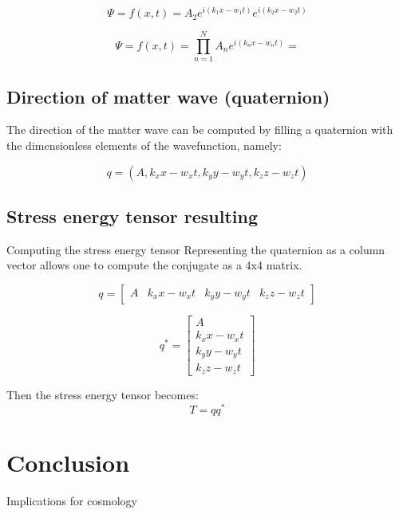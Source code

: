\documentclass{article}
\begin{document}
$$\Psi=f(x,t)=A_2 e^{i(k_1 x-w_1 t)}e^{i(k_2 x-w_2 t)}$$

$$\Psi=f(x,t)=\prod_{n=1}^N{A_n e^{i(k_n x-w_n t)}}=$$

\subsection{Direction of matter wave (quaternion)}
The direction of the matter wave can be computed by filling a quaternion with the dimensionless elements of the wavefunction, namely:

$$q=(A, k_x x-w_x t, k_y y-w_y t, k_z z-w_z t)$$
\subsection{Stress energy tensor resulting}
Computing the stress energy tensor
Representing the quaternion as a column vector allows one to compute the conjugate as a 4x4 matrix.

$$q=
\left[
\begin{matrix}
A&k_x x-w_x t&k_y y-w_y t&k_z z-w_z t
\end{matrix}
\right]
$$

$$q^*=
\left[
\begin{matrix}
A\\k_x x-w_x t\\k_y y-w_y t\\k_z z-w_z t
\end{matrix}
\right]
$$

Then the stress energy tensor becomes:
$$T=qq^*$$
\section{Conclusion}
Implications for cosmology
\end{document}
